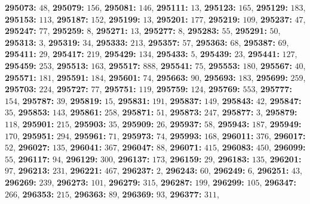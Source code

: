 \textsf{\bfseries 295073:} $48$, \textsf{\bfseries 295079:} $156$, \textsf{\bfseries 295081:} $146$, \textsf{\bfseries 295111:} $13$, \textsf{\bfseries 295123:} $165$, \textsf{\bfseries 295129:} $183$, \textsf{\bfseries 295153:} $113$, \textsf{\bfseries 295187:} $152$, \textsf{\bfseries 295199:} $13$, \textsf{\bfseries 295201:} $177$, \textsf{\bfseries 295219:} $109$, \textsf{\bfseries 295237:} $47$, \textsf{\bfseries 295247:} $77$, \textsf{\bfseries 295259:} $8$, \textsf{\bfseries 295271:} $13$, \textsf{\bfseries 295277:} $8$, \textsf{\bfseries 295283:} $55$, \textsf{\bfseries 295291:} $50$, \textsf{\bfseries 295313:} $3$, \textsf{\bfseries 295319:} $34$, \textsf{\bfseries 295333:} $213$, \textsf{\bfseries 295357:} $57$, \textsf{\bfseries 295363:} $68$, \textsf{\bfseries 295387:} $69$, \textsf{\bfseries 295411:} $29$, \textsf{\bfseries 295417:} $219$, \textsf{\bfseries 295429:} $134$, \textsf{\bfseries 295433:} $5$, \textsf{\bfseries 295439:} $23$, \textsf{\bfseries 295441:} $127$, \textsf{\bfseries 295459:} $253$, \textsf{\bfseries 295513:} $163$, \textsf{\bfseries 295517:} $888$, \textsf{\bfseries 295541:} $75$, \textsf{\bfseries 295553:} $180$, \textsf{\bfseries 295567:} $40$, \textsf{\bfseries 295571:} $181$, \textsf{\bfseries 295591:} $184$, \textsf{\bfseries 295601:} $74$, \textsf{\bfseries 295663:} $90$, \textsf{\bfseries 295693:} $183$, \textsf{\bfseries 295699:} $259$, \textsf{\bfseries 295703:} $224$, \textsf{\bfseries 295727:} $77$, \textsf{\bfseries 295751:} $119$, \textsf{\bfseries 295759:} $124$, \textsf{\bfseries 295769:} $553$, \textsf{\bfseries 295777:} $154$, \textsf{\bfseries 295787:} $39$, \textsf{\bfseries 295819:} $15$, \textsf{\bfseries 295831:} $191$, \textsf{\bfseries 295837:} $149$, \textsf{\bfseries 295843:} $42$, \textsf{\bfseries 295847:} $35$, \textsf{\bfseries 295853:} $143$, \textsf{\bfseries 295861:} $258$, \textsf{\bfseries 295871:} $51$, \textsf{\bfseries 295873:} $247$, \textsf{\bfseries 295877:} $3$, \textsf{\bfseries 295879:} $118$, \textsf{\bfseries 295901:} $215$, \textsf{\bfseries 295903:} $35$, \textsf{\bfseries 295909:} $26$, \textsf{\bfseries 295937:} $58$, \textsf{\bfseries 295943:} $187$, \textsf{\bfseries 295949:} $170$, \textsf{\bfseries 295951:} $294$, \textsf{\bfseries 295961:} $71$, \textsf{\bfseries 295973:} $74$, \textsf{\bfseries 295993:} $168$, \textsf{\bfseries 296011:} $376$, \textsf{\bfseries 296017:} $52$, \textsf{\bfseries 296027:} $135$, \textsf{\bfseries 296041:} $367$, \textsf{\bfseries 296047:} $88$, \textsf{\bfseries 296071:} $415$, \textsf{\bfseries 296083:} $450$, \textsf{\bfseries 296099:} $55$, \textsf{\bfseries 296117:} $94$, \textsf{\bfseries 296129:} $300$, \textsf{\bfseries 296137:} $173$, \textsf{\bfseries 296159:} $29$, \textsf{\bfseries 296183:} $135$, \textsf{\bfseries 296201:} $97$, \textsf{\bfseries 296213:} $231$, \textsf{\bfseries 296221:} $467$, \textsf{\bfseries 296237:} $2$, \textsf{\bfseries 296243:} $60$, \textsf{\bfseries 296249:} $6$, \textsf{\bfseries 296251:} $43$, \textsf{\bfseries 296269:} $239$, \textsf{\bfseries 296273:} $101$, \textsf{\bfseries 296279:} $315$, \textsf{\bfseries 296287:} $199$, \textsf{\bfseries 296299:} $105$, \textsf{\bfseries 296347:} $266$, \textsf{\bfseries 296353:} $215$, \textsf{\bfseries 296363:} $89$, \textsf{\bfseries 296369:} $93$, \textsf{\bfseries 296377:} $311$, 
